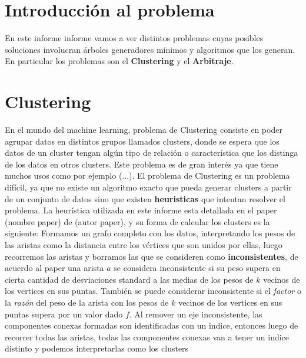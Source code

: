 \documentclass[8pt,a4paper]{article}
\begin{document}

\fecha{\today}



\maketitle

\newpage
%

\section{Introducción al problema}
En este informe informe vamos a ver distintos problemas cuyas posibles soluciones involucran árboles generadores mínimos y algoritmos que los generan. En particular los problemas son el \textbf{Clustering} y el \textbf{Arbitraje}.

\section{Clustering}
En el mundo del machine learning, problema de Clustering consiste en poder agrupar datos en distintos grupos llamados clusters, donde se espera que los datos de un cluster tengan algún tipo de relación o característica que los distinga de los datos en otros clusters. Este problema es de gran interés ya que tiene muchos usos como por ejemplo (...).
%
%
El problema de Clustering es un problema difícil, ya que no existe un algoritmo exacto que pueda generar clusters a partir de un conjunto de datos sino que existen \textbf{heuristicas} que intentan resolver el problema. La heurística utilizada en este informe esta detallada en el paper (nombre paper) de (autor paper), y su forma de calcular los clusters es la siguiente: Formamos un grafo completo con los datos, interpretando los pesos de las aristas como la distancia entre los vértices que son unidos por ellas, luego recorremos las aristas y borramos las que se consideren como \textbf{inconsistentes}, de acuerdo al paper una arista $a$ se considera inconsistente si su peso supera en cierta cantidad de desviaciones standard a las medias de los pesos de $k$ vecinos de los vertices en sus puntas. También se puede considerar inconsistente si el \textit{factor} o la \textit{razón} del peso de la arista con los pesos de $k$ vecinos de los vertices en sus puntas supera por un valor dado $f$. Al remover un eje inconsistente, las componentes conexas formadas son identificadas con un indice, entonces luego de recorrer todas las aristas, todas las componentes conexas van a tener un  indice distinto y podemos interpretarlas como los clusters
\end{document}
